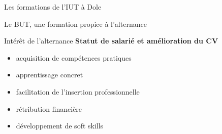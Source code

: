 \documentclass [xcolor=x11names,t] {beamer}
\begin{document}
\begin{frame}{Les formations de l'IUT à Dole} %

  \begin{center}
    \resizebox{1\textheight}{!}{}
  \end{center}
%
\end{frame}


\begin{frame}{Le BUT, une formation propice à l'alternance} 

\begin{block}{Intérêt de l'alternance}
\textbf{Statut de salarié et amélioration du CV}
\begin{itemize}
    \item acquisition de compétences pratiques %
    \item  apprentissage concret %
    \item facilitation de l'insertion professionnelle %
    \item rétribution financière %
    \item développement de soft skills %

\end{itemize}
\end{block}
\end{frame}
\end{document}
